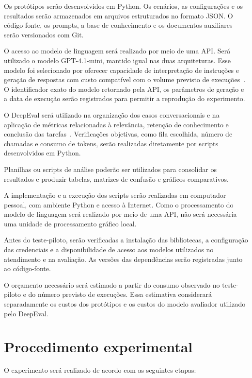 Os protótipos serão desenvolvidos em Python. Os cenários, as configurações e os resultados serão armazenados em arquivos estruturados no formato \gls{JSON}. O código-fonte, os prompts, a base de conhecimento e os documentos auxiliares serão versionados com Git.

O acesso ao modelo de linguagem será realizado por meio de uma \gls{API}. Será utilizado o modelo GPT-4.1-mini, mantido igual nas duas arquiteturas. Esse modelo foi selecionado por oferecer capacidade de interpretação de instruções e geração de respostas com custo compatível com o volume previsto de execuções~\cite{openai:gpt41mini}. O identificador exato do modelo retornado pela \gls{API}, os parâmetros de geração e a data de execução serão registrados para permitir a reprodução do experimento.

O DeepEval será utilizado na organização dos casos conversacionais e na aplicação de métricas relacionadas à relevância, retenção de conhecimento e conclusão das tarefas~\cite{deepeval}. Verificações objetivas, como fila escolhida, número de chamadas e consumo de tokens, serão realizadas diretamente por scripts desenvolvidos em Python.

Planilhas ou scripts de análise poderão ser utilizados para consolidar os resultados e produzir tabelas, matrizes de confusão e gráficos comparativos.

A implementação e a execução dos scripts serão realizadas em
computador pessoal, com ambiente Python e acesso à Internet.
Como o processamento do modelo de linguagem será realizado por
meio de uma \gls{API}, não será necessária uma unidade de processamento
gráfico local.

Antes do teste-piloto, serão verificadas a instalação das bibliotecas,
a configuração das credenciais e a disponibilidade de acesso aos
modelos utilizados no atendimento e na avaliação. As versões das
dependências serão registradas junto ao código-fonte.

O orçamento necessário será estimado a partir do consumo observado
no teste-piloto e do número previsto de execuções. Essa estimativa
considerará separadamente os custos dos protótipos e os custos
do modelo avaliador utilizado pelo DeepEval.

\section{Procedimento experimental}\label{sec:procedimento-experimental}

O experimento será realizado de acordo com as seguintes etapas:

